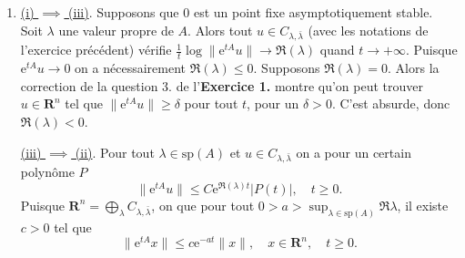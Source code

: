 \documentclass[a4paper,12pt,openany]{article}
\theoremstyle{plain}
\theoremstyle{definition}
\newcommand{\e}{\mathrm{e}}
\newcommand{\R}{\mathbf{R}}
\begin{document}
\begin{enumerate}
\item \underline{(i) $\implies$ (iii)}. Supposons que $0$ est un point fixe asymptotiquement stable. Soit $\lambda$ une valeur propre de $A$. Alors tout $u \in C_{\lambda, \bar \lambda}$ (avec les notations de l'exercice pr\'ec\'edent) v\'erifie $\frac{1}{t} \log \|\e^{tA}u\| \to \Re(\lambda)$ quand $t \to +\infty$. Puisque $\e^{tA}u \to 0$ on a n\'ecessairement $\Re(\lambda) \leq 0$. Supposons $\Re(\lambda) = 0$. Alors la correction de la question 3. de l'\textbf{Exercice 1.} montre qu'on peut trouver $u \in \R^n$ tel que $\|\e^{tA} u\| \geq \delta$ pour tout $t$, pour un $\delta > 0$. C'est absurde, donc $\Re(\lambda) < 0$. \newline

\underline{(iii) $\implies$ (ii)}. Pour tout $\lambda \in \mathrm{sp}(A)$ et $u \in C_{\lambda, \bar \lambda}$ on a pour un certain polyn\^ome $P$
$$
\|\e^{tA}u\| \leq C \e^{\Re(\lambda) t} |P(t)|, \quad t \geq 0.
$$
Puisque $\R^n = \bigoplus_\lambda C_{\lambda, \bar \lambda}$, on que pour tout $0 > a > \sup_{\lambda \in \mathrm{sp}(A)} \Re \lambda$, il existe $c > 0$ tel que 
\begin{equation}\label{eq:exp}
\|\e^{tA}x\| \leq c \e^{-at} \|x\|, \quad x \in \R^n, \quad t \geq 0.
\end{equation}


\end{enumerate}
\end{document}

